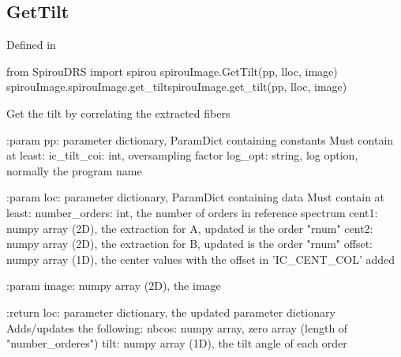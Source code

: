 \begin{minipage}{\textwidth}
\subsection{GetTilt}

Defined in \spirouImage{}

\begin{pythonbox}
from SpirouDRS import spirou
spirouImage.GetTilt(pp, lloc, image)
spirouImage.spirouImage.get_tiltspirouImage.get_tilt(pp, lloc, image)
\end{pythonbox}

\begin{pythondocstring}
Get the tilt by correlating the extracted fibers

:param pp: parameter dictionary, ParamDict containing constants
    Must contain at least:
            ic_tilt_coi: int, oversampling factor
            log_opt: string, log option, normally the program name

:param loc: parameter dictionary, ParamDict containing data
        Must contain at least:
            number_orders: int, the number of orders in reference spectrum
            cent1: numpy array (2D), the extraction for A, updated is
                   the order "rnum"
            cent2: numpy array (2D), the extraction for B, updated is
                   the order "rnum"
            offset: numpy array (1D), the center values with the
                    offset in 'IC_CENT_COL' added

:param image: numpy array (2D), the image

:return loc: parameter dictionary, the updated parameter dictionary
        Adds/updates the following:
            nbcos: numpy array, zero array  (length of "number_orderes")
            tilt: numpy array (1D), the tilt angle of each order
\end{pythondocstring}
\end{minipage}


